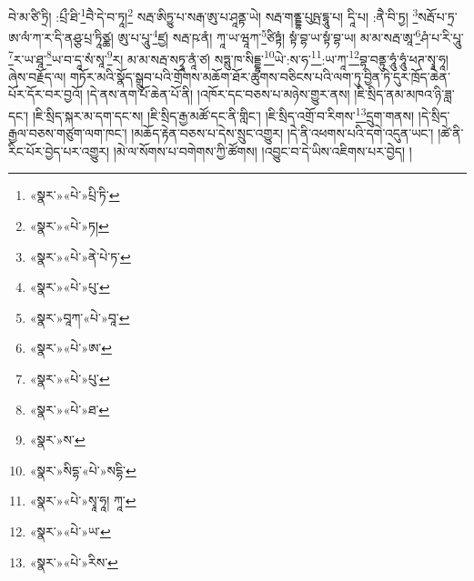 བེ་མ་ཙི་ཏྲི། :པྲྀ་ཐི་\footnote{«སྣར་»«པེ་»པྲི་ཏི་}བཻ་དེ་བ་ཏཱ།\footnote{«སྣར་»«པེ་»ཏ།} སརྦ་ཨིཏྱུ་པ་སརྒ་ཨུ་པ་ཤཱནྟ་ཡེ། སརྦ་གནྡྷ་པུཥྤ་དྷཱུ་པ། དཱི་པ། :ནཻ་བི་ཏྱ། \footnote{«སྣར་»«པེ་»ནེ་པེ་ཏ་}སརྦོ་པ་ཏྲ་ཨ་ལཾ་ཀ་ར་དི་ནཤྩ་པྲ་ཏཱིཙྪ། ཨུ་པ་པཱུ་\footnote{«སྣར་»«པེ་»པུ་}ཛྱ། སརྦ་ཥ་ནཾ། ཀཱ་ཡ་ཝཱཀ་\footnote{«སྣར་»བཱཀ་«པེ་»བཱ་}ཙིཏྟཾ། སྟཾ་བྷ་ཡ་སྟཾ་བྷ་ཡ། མ་མ་སརྦ་ཨཱ་\footnote{«སྣར་»«པེ་»ཨ་}ཤཾ་པ་རི་པཱུ་\footnote{«སྣར་»«པེ་»པུ་}ར་ཡ་ཐཱ་\footnote{«སྣར་»«པེ་»ཐ་}ཡ་བ་དཱ་སཾ་སཱ་\footnote{«སྣར་»ས་}ར། མ་མ་སརྦ་སཏྭཱ་ནཱཾ་ཙ། སཏྶུ་ཁ་སིདྡྷ་\footnote{«སྣར་»སིདྷ་«པེ་»སདྷི་}ཡེ་:ས་ཧ་\footnote{«སྣར་»«པེ་»སྭཱ་ཧཱ། ཀཱ་}:ཡ་ཀཱ་\footnote{«སྣར་»«པེ་»ཡ་}བྷ་བནྟུ་ཧཱུཾ་ཧཱུཾ་ཕཊ་སྭཱ་ཧཱ། ཞེས་བརྗོད་ལ། གཏོར་མའི་སྣོད་སྒྲུབ་པའི་གྲོགས་མཆོག་ཐོར་ཚུགས་བཅིངས་པའི་ལག་ཏུ་བྱིན་ཏེ་དུར་ཁྲོད་ཆེན་པོར་དོར་བར་བྱའོ། །དེ་ནས་ནག་པོ་ཆེན་པོ་ནི། །འཁོར་དང་བཅས་པ་མཉེས་གྱུར་ནས། །ཇི་སྲིད་ནམ་མཁའ་ཉི་ཟླ་དང་། །ཇི་སྲིད་སྐར་མ་དག་དང་ས། །ཇི་སྲིད་རྒྱ་མཚོ་དང་ནི་གླིང་། །ཇི་སྲིད་འགྲོ་བ་རིགས་\footnote{«སྣར་»«པེ་»རིས་}དྲུག་གནས། །དེ་སྲིད་རྒྱལ་བཅས་གཙུག་ལག་ཁང་། །མཆོད་རྟེན་བཅས་པ་དེས་སྲུང་འགྱུར། །དེ་ནི་འཕགས་པའི་དགེ་འདུན་ཡང་། །ཚེ་ནི་རིང་པོར་བྱེད་པར་འགྱུར། །མེ་ལ་སོགས་པ་བགེགས་ཀྱི་ཚོགས། །འབྱུང་བ་དེ་ཡིས་འཇིགས་པར་བྱེད། །
